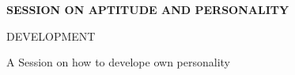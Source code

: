 \documentclass[12pt, a4 paper]{article}
\begin{document}

\clearpage




\begin{center}
\Huge \bfseries \ttfamily SESSION ON APTITUDE AND PERSONALITY

DEVELOPMENT
\end{center}

\begin{center}
\large A Session on how to develope own personality 
\end{center}
\end{document}
